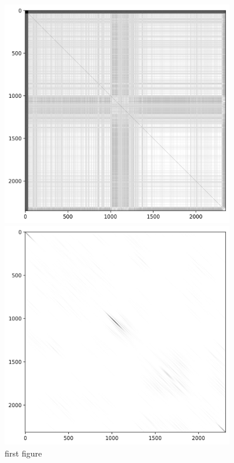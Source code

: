 \begin{figure}[ht]
    \centering
    \begin{minipage}{0.45\textwidth}
        \centering
        \includegraphics[width=0.9\textwidth]{figures/images/salami_391_R matrix after Gaussian smoothing.png} %
        \caption[]{first figure}
    \end{minipage}\hfill
    \begin{minipage}{0.45\textwidth}
        \centering
        \includegraphics[width=0.9\textwidth]{figures/images/salami_391_Lag matrix after Gaussian smoothing.png} %

\end{minipage}
\end{figure}
